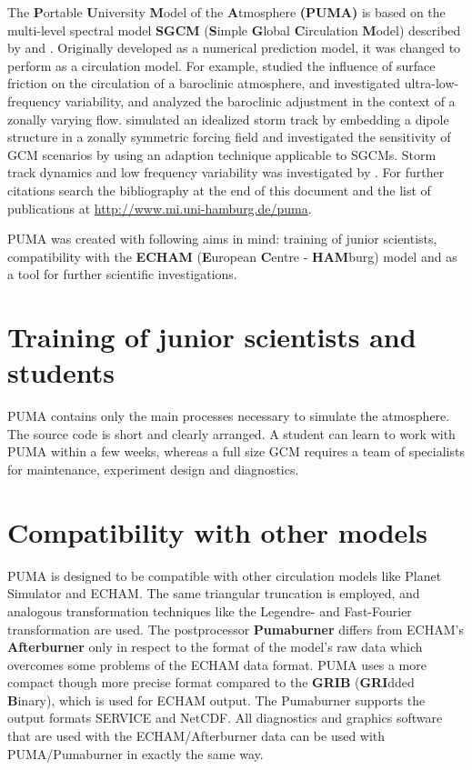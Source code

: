      The {\bf P}ortable {\bf U}niversity {\bf M}odel of the
     {\bf A}tmosphere {\bf (PUMA)} is based on the multi-level spectral
     model {\bf SGCM} ({\bf S}imple {\bf G}lobal {\bf C}irculation
     {\bf M}odel) described by \citep{hossim75} and \citep{jamesgray86}.
     Originally developed as a numerical prediction model,
     it was changed to perform as a circulation model. For example,
     \citep{jamesgray86} studied the influence of surface friction
     on the circulation of a baroclinic atmosphere, \citep{jamesjames92}
      and \citep{JamFraeJam94} investigated ultra-low-frequency
     variability, and \citep{molejames90} analyzed the baroclinic
     adjustment in the context of a zonally varying flow. \citep{frisius98}
      simulated an idealized storm track by embedding
     a dipole structure in a zonally symmetric forcing field and \citep{lunkeit98}
     investigated the sensitivity of GCM scenarios by using
     an adaption technique applicable to SGCMs.
     Storm track dynamics and low frequency variability
     was investigated by \citep{fraedrich2005}. For further citations search the
     bibliography at the end of this document and the list of publications at 
     {\url{http://www.mi.uni-hamburg.de/puma}}.

    
     PUMA was created with following aims in mind: training of junior
     scientists, compatibility with the {\bf ECHAM} 
     ({\bf E}uropean {\bf C}entre - {\bf HAM}burg) model and as a tool for
     further scientific investigations.
     

\section{Training of junior scientists and students}
     PUMA contains only the main processes necessary to simulate
     the atmosphere. The source code is short and clearly arranged.
     A student can learn to work with PUMA within a few weeks, whereas a
     full size GCM requires a team of specialists for maintenance,
     experiment design and diagnostics.
    
\section{Compatibility with other models}
     PUMA is designed to be compatible with other
     circulation models like Planet Simulator and ECHAM.
     The same triangular truncation is employed,
     and analogous transformation techniques like the Legendre- and
     Fast-Fourier transformation are used.
     The postprocessor {\bf Pumaburner} differs from ECHAM's
     {\bf Afterburner} only in respect to the format of the model's
     raw data which overcomes some problems of the ECHAM data format.
     PUMA uses a more compact though more precise
     format compared to the {\bf GRIB} ({\bf GRI}dded {\bf B}inary),
     which is used for ECHAM output.
     The Pumaburner supports the output formats SERVICE and
     NetCDF. All diagnostics and graphics software that are used with the
     ECHAM/Afterburner data can be used with PUMA/Pumaburner
     in exactly the same way.

